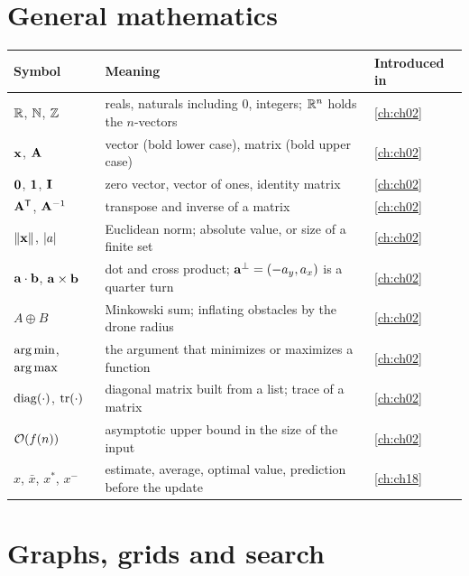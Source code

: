 \section*{General mathematics}

{\small\renewcommand{\arraystretch}{1.0}%
\noindent\begin{tabularx}{\textwidth}{@{}lYl@{}}
\toprule
\textbf{Symbol} & \textbf{Meaning} & \textbf{Introduced in}\\
\midrule
$\mathbb{R}$, $\mathbb{N}$, $\mathbb{Z}$ & reals, naturals including $0$, integers; $\mathbb{R}^n$ holds the $n$-vectors & \cref{ch:ch02}\\
$\mathbf{x}$, $\mathbf{A}$ & vector (bold lower case), matrix (bold upper case) & \cref{ch:ch02}\\
$\mathbf{0}$, $\mathbf{1}$, $\mathbf{I}$ & zero vector, vector of ones, identity matrix & \cref{ch:ch02}\\
$\mathbf{A}^{\mathsf{T}}$, $\mathbf{A}^{-1}$ & transpose and inverse of a matrix & \cref{ch:ch02}\\
$\left\lVert \mathbf{x} \right\rVert$, $\left\lvert a \right\rvert$ & Euclidean norm; absolute value, or size of a finite set & \cref{ch:ch02}\\
$\mathbf{a}\cdot\mathbf{b}$, $\mathbf{a}\times\mathbf{b}$ & dot and cross product; $\mathbf{a}^{\perp}=(-a_y,a_x)$ is a quarter turn & \cref{ch:ch02}\\
$A\oplus B$ & Minkowski sum; inflating obstacles by the drone radius & \cref{ch:ch02}\\
$\operatorname*{arg\,min}$, $\operatorname*{arg\,max}$ & the argument that minimizes or maximizes a function & \cref{ch:ch02}\\
$\operatorname{diag}(\cdot)$, $\operatorname{tr}(\cdot)$ & diagonal matrix built from a list; trace of a matrix & \cref{ch:ch02}\\
$\mathcal{O}\!\left(f(n)\right)$ & asymptotic upper bound in the size of the input & \cref{ch:ch02}\\
$\hat{x}$, $\bar{x}$, $x^*$, $x^-$ & estimate, average, optimal value, prediction before the update & \cref{ch:ch18}\\
\bottomrule
\end{tabularx}\par}

\section*{Graphs, grids and search}

